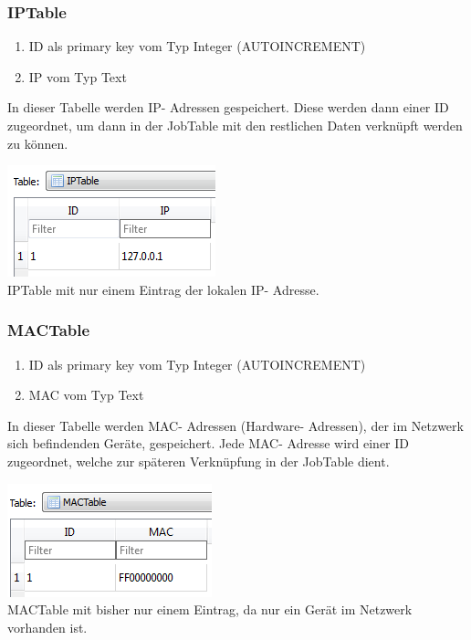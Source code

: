 \documentclass[12pt,a4paper]{report}
\begin{document}
\begin{onehalfspace}
\subsubsection{IPTable}
\begin{enumerate}
\item ID als primary key vom Typ Integer (AUTOINCREMENT)
\item IP vom Typ Text
\end{enumerate}
In dieser Tabelle werden IP- Adressen gespeichert. Diese werden dann einer ID zugeordnet, um dann in der JobTable mit den restlichen Daten verknüpft werden zu können.
\begin{center}
\includegraphics[scale=0.8]{img/db-tb-ip.png}\\
IPTable mit nur einem Eintrag der lokalen IP- Adresse.
\end{center}
\subsubsection{MACTable}
\begin{enumerate}
\item ID als primary key vom Typ Integer (AUTOINCREMENT)
\item MAC vom Typ Text
\end{enumerate}
In dieser Tabelle werden MAC- Adressen (Hardware- Adressen), der im Netzwerk sich befindenden Geräte, gespeichert. Jede MAC- Adresse wird einer ID zugeordnet, welche zur späteren Verknüpfung in der JobTable dient.
\begin{center}
\includegraphics[scale=0.8]{img/db-tb-mac.png}\\
MACTable mit bisher nur einem Eintrag, da nur ein Gerät im Netzwerk vorhanden ist.
\end{center}

\end{onehalfspace}
\end{document}
